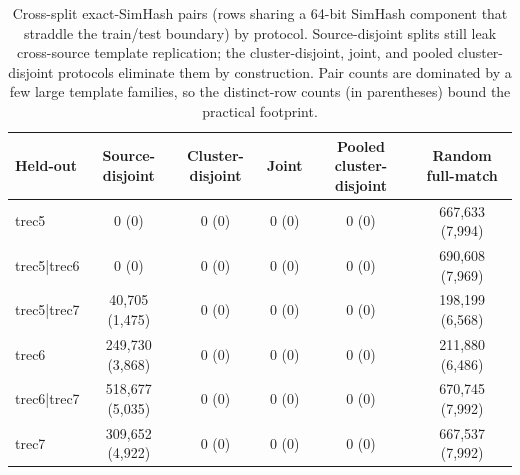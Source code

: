 
\begin{table}[!htbp]
\centering
\caption{Cross-split exact-SimHash pairs (rows sharing a 64-bit SimHash component that straddle the train/test boundary) by protocol. Source-disjoint splits still leak cross-source template replication; the cluster-disjoint, joint, and pooled cluster-disjoint protocols eliminate them by construction. Pair counts are dominated by a few large template families, so the distinct-row counts (in parentheses) bound the practical footprint.}
\label{tab:cluster_leakage}
\begin{tabular}{lccccc}
\hline\hline
Held-out & Source-disjoint & Cluster-disjoint & Joint & Pooled cluster-disjoint & Random full-match \\
\hline
trec5 & 0 (0) & 0 (0) & 0 (0) & 0 (0) & 667,633 (7,994) \\
trec5|trec6 & 0 (0) & 0 (0) & 0 (0) & 0 (0) & 690,608 (7,969) \\
trec5|trec7 & 40,705 (1,475) & 0 (0) & 0 (0) & 0 (0) & 198,199 (6,568) \\
trec6 & 249,730 (3,868) & 0 (0) & 0 (0) & 0 (0) & 211,880 (6,486) \\
trec6|trec7 & 518,677 (5,035) & 0 (0) & 0 (0) & 0 (0) & 670,745 (7,992) \\
trec7 & 309,652 (4,922) & 0 (0) & 0 (0) & 0 (0) & 667,537 (7,992) \\
\hline\hline
\end{tabular}
\end{table}
